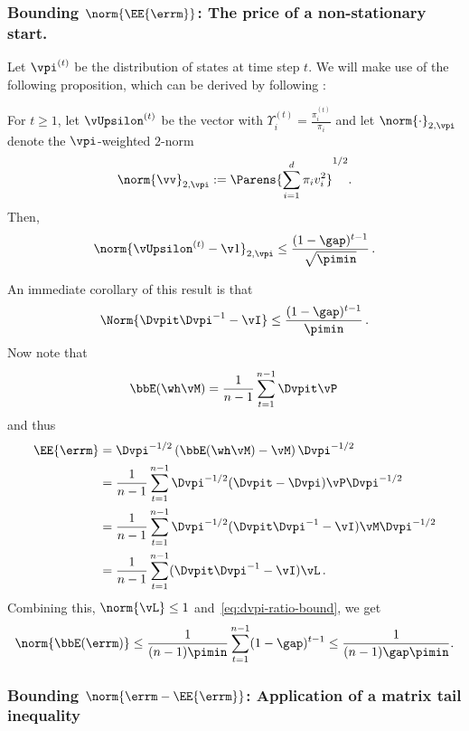 \subsubsection{Bounding $\norm{\EE{\errm}}$: The price of a non-stationary start.}
Let $\vpi^{(t)}$ be the distribution of states at time step $t$.
We will make use of the following proposition, which can be derived by
following \citet[Proposition 1.12]{MoTe06}:
\begin{proposition}
For $t\ge 1$, let $\vUpsilon^{(t)}$ be the vector with $\Upsilon^{(t)}_i= \frac{\pi_i^{(t)}}{\pi_i}$ and let
$\norm{\cdot}_{2,\vpi}$ denote the $\vpi$-weighted $2$-norm
\begin{align}
\label{eq:vv}
  \norm{\vv}_{2,\vpi} := \Parens{ \sum_{i=1}^d \pi_i v_i^2 }^{1/2}
  .
\end{align}
 Then,
\begin{equation}
  \label{eq:L2-contraction}
  \norm{ \vUpsilon^{(t)} - \v1 }_{2,\vpi} \leq
  \frac{(1-\gap)^{t-1}}{\sqrt{\pimin}} \,.
\end{equation}
\end{proposition}
An immediate corollary of this result is that 
\begin{align}
\label{eq:dvpi-ratio-bound}
\Norm{  \Dvpit \Dvpi^{-1} - \vI  } \le \frac{(1-\gap)^{t-1}}{\pimin}\,.
\end{align}
Now note that
\begin{align*}
\bbE (\wh\vM) = \frac{1}{n-1} \sum_{t=1}^{n-1} \Dvpit \vP\,
\end{align*}
and thus
\begin{align*}
\EE{\errm} &=
  \Dvpi^{-1/2}
  \left(\bbE( \wh\vM )- \vM\right)
  \Dvpi^{-1/2}\\
& =  
  \frac{1}{n-1} \sum_{t=1}^{n-1}
  \Dvpi^{-1/2} (\Dvpit  - \Dvpi) \vP \Dvpi^{-1/2} \\
& =  
  \frac{1}{n-1} \sum_{t=1}^{n-1}
  \Dvpi^{-1/2} (\Dvpit \Dvpi^{-1} - \vI) \vM \Dvpi^{-1/2} \\
& =  
  \frac{1}{n-1} \sum_{t=1}^{n-1}
   (\Dvpit \Dvpi^{-1} - \vI) \vL \,.
\end{align*}
Combining this, $\norm{\vL}\le 1$ and~\cref{eq:dvpi-ratio-bound}, we get
\begin{align}
  \norm{\bbE(\errm)}
  \le \frac{1}{(n-1)\pimin} \sum_{t=1}^{n-1} (1-\gap)^{t-1}
  \le \frac{1}{(n-1)\gap\pimin}
  .
  \label{eq:biasbound}
\end{align}

\subsubsection{
Bounding $\norm{\errm-\EE{\errm}}$: 
Application of a matrix tail inequality}
\label{sec:pairwise-tailbound}

